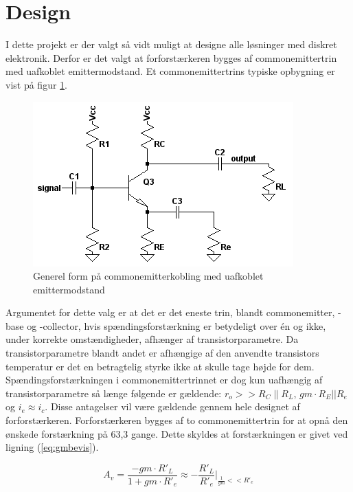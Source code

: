 \section{Design}
I dette projekt er der valgt så vidt muligt at designe alle løsninger med diskret elektronik. Derfor er det valgt at forforstærkeren bygges af commonemittertrin med uafkoblet emittermodstand. Et commonemittertrins typiske opbygning er vist på figur \ref{fig:cekobling}.

\begin{figure}[h]
\centering
\includegraphics[scale=.6]{teknisk/forforstaerker/ceopkobling.png}
\caption{Generel form på commonemitterkobling med uafkoblet emittermodstand}
\label{fig:cekobling}
\end{figure}


Argumentet for dette valg er at det er det eneste trin, blandt commonemitter, -base og -collector, hvis spændingsforstærkning er betydeligt over én og ikke, under korrekte omstændigheder, afhænger af transistorparametre. Da transistorparametre blandt andet er afhængige af den anvendte transistors temperatur er det en betragtelig styrke ikke at skulle tage højde for dem. Spændingsforstærkningen i commonemittertrinnet er dog kun uafhængig af transistorparametre så længe følgende er gældende: $r_o >>R_C \| R_L$, $gm \cdot R_E||R_e$ og $i_e \approx i_c$.
Disse antagelser vil være gældende gennem hele designet af forforstærkeren. 
Forforstærkeren bygges af to commonemittertrin for at opnå den ønskede forstærkning på 63,3 gange. Dette skyldes at forstærkningen er givet ved ligning (\ref{eq:gmbevis}).

\begin{equation}
A_v =  \frac{-gm \cdot R'_L}{1+gm \cdot R'_e} \approx  -\frac{R'_L}{R'_e} \Biggr\vert _{\frac{1}{gm}<<R'_e}
\label{eq:gmbevis}
\end{equation}

